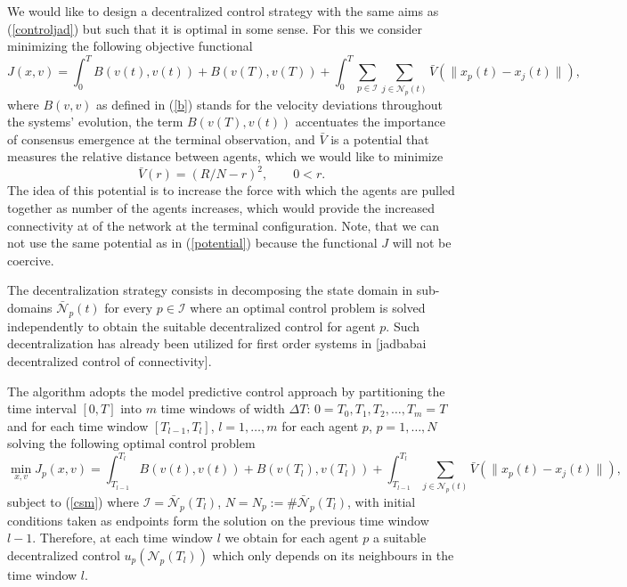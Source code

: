 \documentclass[a4paper,10pt, english]{article}
\begin{document}
We would like to design a decentralized control strategy with the same aims as (\ref{controljad}) but such that it is optimal in some sense. 
For this we consider minimizing the following objective functional 
\begin{equation}
J(x, v) = \int_{0}^{T}B(v(t), v(t)) + B(v(T), v(T)) + \int_{0}^{T}\sum_{p\in \mathcal{I}}\sum_{j\in \mathcal{N}_p(t)} \bar{V}(\|x_p(t) - x_j(t)\|),
\label{Vt}
\end{equation}
where $B(v, v)$ as defined in (\ref{b})  stands for the velocity deviations throughout the systems' evolution, the term 
$B(v(T), v(t))$ accentuates the importance of consensus emergence at the terminal observation, and $\bar{V}$ is a potential that measures the relative distance between agents, which we would like to minimize
\begin{equation}
\bar{V}(r) = (R/N- r)^2, \qquad 0 < r.
\label{potentialbar}
\end{equation}
The idea of this potential is to increase the force with which the agents are pulled together as number of the agents increases, which would provide the increased connectivity at of the network at the terminal configuration. Note, that we can not use the same potential as in (\ref{potential}) because the functional $J$ will not be coercive.






The decentralization strategy consists in decomposing the state domain in sub-domains $\bar{\mathcal{N}}_p(t)$ for every $p\in \mathcal{I}$ where an optimal control problem is solved independently to obtain the suitable decentralized control for agent $p$. Such decentralization has already been utilized for first order systems in [jadbabai decentralized control of connectivity].

 The algorithm adopts the model predictive control approach by partitioning the time interval $[0, T]$ into $m$ time windows of width $\Delta T$: $0 = T_0, T_1, T_2, \dots, T_m = T$ and for each time window  $[T_{l-1}, T_{l}]$, $l = 1, \dots, m$ for each agent $p$, $p = 1, \dots, N$  solving the following optimal control problem
\begin{equation}
 \min_{x, v} J_p(x, v) = \int_{T_{l-1}}^{T_l}B(v(t), v(t)) + B(v(T_l), v(T_l)) + \int_{T_{l-1}}^{T_l}\sum_{j\in \mathcal{N}_p(t)} \bar{V}(\|x_p(t) - x_j(t)\|),
\label{opci}
\end{equation}
subject to (\ref{csm}) where $\mathcal{I} = \bar{\mathcal{N}}_p(T_l)$,  $N = N_p:= \# \bar{\mathcal{N}}_p(T_l)$, with initial conditions taken as endpoints form the solution on the previous time window $l-1$.
Therefore, at each time window $l$ we obtain for each agent $p$ a suitable decentralized control $u_p(\mathcal{N}_p(T_l))$ which only depends on its neighbours in the time window $l$.
 
\end{document}
